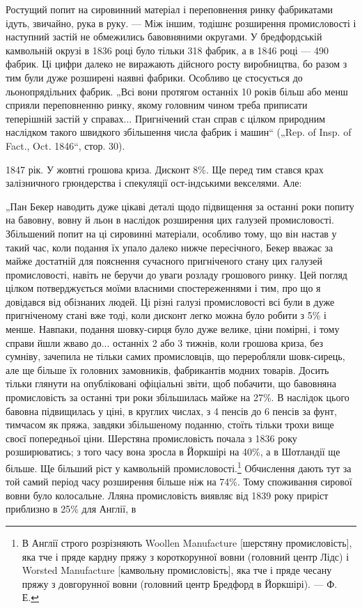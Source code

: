 Ростущий попит на сировинний матеріал і переповнення
ринку фабрикатами ідуть, звичайно, рука в руку. — Між іншим,
тодішнє розширення промисловості і наступний застій не обмежились
бавовняними округами. У бредфордській камвольній
окрузі в 1836 році було тільки 318 фабрик, а в 1846 році —
490 фабрик. Ці цифри далеко не виражають дійсного росту
виробництва, бо разом з тим були дуже розширені наявні фабрики.
Особливо це стосується до льонопрядільних фабрик. „Всі
вони протягом останніх 10 років більш або менш сприяли переповненню
ринку, якому головним чином треба приписати теперішній
застій у справах... Пригнічений стан справ є цілком природним
наслідком такого швидкого збільшення числа фабрик
і машин“ („Rep. of Insp. of Fact., Oct. 1846“, стор. 30).

1847 рік. У жовтні грошова криза. Дисконт 8\%. Ще перед
тим стався крах залізничного грюндерства і спекуляції ост-індськими
векселями. Але:

„Пан Бекер наводить дуже цікаві деталі щодо підвищення
за останні роки попиту на бавовну, вовну й льон в наслідок
розширення цих галузей промисловості. Збільшений попит на ці
сировинні матеріали, особливо тому, що він настав у такий час,
коли подання їх упало далеко нижче пересічного, Бекер вважає
за майже достатній для пояснення сучасного пригніченого стану
цих галузей промисловості, навіть не беручи до уваги розладу
грошового ринку. Цей погляд цілком потверджується моїми
власними спостереженнями і тим, про що я довідався від обізнаних
людей. Ці різні галузі промисловості всі були в дуже
пригніченому стані вже тоді, коли дисконт легко можна було
робити з 5\% і менше. Навпаки, подання шовку-сирця було дуже
велике, ціни помірні, і тому справи йшли жваво до... останніх
2 або 3 тижнів, коли грошова криза, без сумніву, зачепила не
тільки самих промисловців, що переробляли шовк-сирець, але
ще більше їх головних замовників, фабрикантів модних товарів.
Досить тільки глянути на опубліковані офіціальні звіти, щоб побачити,
що бавовняна промисловість за останні три роки збільшилась
майже на 27\%. В наслідок цього бавовна підвищилась
у ціні, в круглих числах, з 4 пенсів до 6 пенсів за фунт, тимчасом
як пряжа, завдяки збільшеному поданню, стоїть тільки
трохи вище своєї попередньої ціни. Шерстяна промисловість почала
з 1836 року розширюватись; з того часу вона зросла в
Йоркшірі на 40\%, а в Шотландії ще більше. Ще більший ріст
у камвольній промисловості.\footnote{
В Англії строго розрізняють Woollen Manufacture [шерстяну промисловість],
яка тче і пряде кардну пряжу з короткорунної вовни (головний центр Лідс)
і Worsted Manufacture [камвольну промисловість], яка тче і пряде чесану пряжу
з довгорунної вовни (головний центр Бредфорд в Йоркшірі). — Ф. Е.
} Обчислення дають тут за той
самий період часу розширення більше ніж на 74\%. Тому споживання
сирової вовни було колосальне. Лляна промисловість виявляє
від 1839 року приріст приблизно в 25\% для Англії, в
\parbreak{}  %
